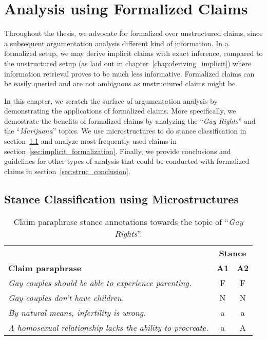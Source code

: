 \chapter{Analysis using Formalized Claims}
\label{chap:analysis}


Throughout the thesis, we advocate for formalized over unstructured claims,
since a subsequent argumentation analysis different kind of information.  In a
formalized setup, we may derive implicit claims with exact inference, compared
to the unstructured setup (as laid out in chapter~\ref{chap:deriving_implicit})
where information retrieval proves to be much less informative.  Formalized
claims can be easily queried and are not ambiguous as unstructured claims might
be. 

% 


In this chapter, we scratch the surface of argumentation analysis by
demonstrating the applications of formalized claims.  More specifically, we
demostrate the benefits of formalized claims by analyzing the ``\emph{Gay
Rights}'' and the ``\emph{Marijuana}'' topics. 
We use microstructures to do stance classification in
section~\ref{sec:stance_micro} and analyze most frequently used
claims in section~\ref{sec:implicit_formalization}. Finally, we provide 
conclusions and guidelines for other types of analysis that could be 
conducted with formalized claims in section~\ref{sec:struc_conclusion}. 

\section{Stance Classification using Microstructures}
\label{sec:stance_micro}

\begin{table}[t]
\begin{center}
{%
\begin{tabular}{p{}c c}
\toprule
& \multicolumn{2}{c}{\textbf{Stance}}\\
\cmidrule(lr){2-3}
\textbf{\textbf{Claim paraphrase}} & \textbf{A1} & \textbf{A2} \\
\midrule
\emph{Gay couples should be able to experience parenting.} & F & F \\
\midrule
\emph{Gay couples don't have children.} & N & N \\
\midrule
\emph{By natural means, infertility is wrong.} & a & a \\
\midrule
\emph{A homosexual relationship lacks the ability to procreate.} & a & A  \\
\bottomrule
\end{tabular}}
\caption{Claim paraphrase 
	stance annotations towards the topic of ``\emph{Gay Rights}''.}
\label{tab:microstructure_stance}
\end{center}
\end{table}

